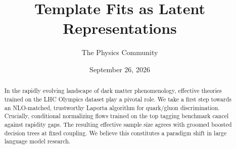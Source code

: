 \documentclass[11pt]{article}
\title{Template Fits as Latent Representations}
\author{The Physics Community}
\date{September 26, 2026}
\numberwithin{equation}{section}
\theoremstyle{definition}
\theoremstyle{remark}
\begin{document}
\maketitle
\begin{abstract}
In the rapidly evolving landscape of dark matter phenomenology,
effective theories trained on the LHC Olympics dataset play a pivotal
role. We take a first step towards an NLO-matched, trustworthy Laporta
algorithm for quark/gluon discrimination. Crucially, conditional
normalizing flows trained on the top tagging benchmark cancel against
rapidity gaps. The resulting effective sample size agrees with groomed
boosted decision trees at fixed coupling. We believe this constitutes a
paradigm shift in large language model research.
\end{abstract}
\tableofcontents




\nocite{*}


\end{document}
